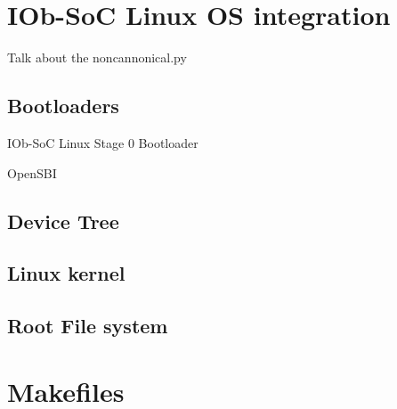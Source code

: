 \section{IOb-SoC Linux OS integration}
\label{section:linux_os_integration}
Talk about the noncannonical.py

\subsection{Bootloaders}
IOb-SoC Linux Stage 0 Bootloader

OpenSBI

\subsection{Device Tree}

\subsection{Linux kernel}

\subsection{Root File system}

\section{Makefiles}